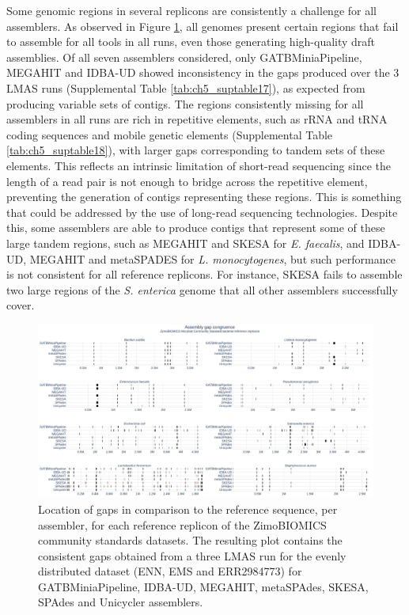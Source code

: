 Some genomic regions in several replicons are consistently a challenge for all assemblers. As observed in Figure \ref{fig:chap5_figure8}, all genomes present certain regions that fail to assemble for all tools in all runs, even those generating high-quality draft assemblies. Of all seven assemblers considered, only GATBMiniaPipeline, MEGAHIT and IDBA-UD showed inconsistency in the gaps produced over the 3 LMAS runs (Supplemental Table \ref{tab:ch5_suptable17}), as expected from producing variable sets of contigs. The regions consistently missing for all assemblers in all runs are rich in repetitive elements, such as rRNA and tRNA coding sequences and mobile genetic elements (Supplemental Table \ref{tab:ch5_suptable18}), with larger gaps corresponding to tandem sets of these elements. This reflects an intrinsic limitation of short-read sequencing since the length of a read pair is not enough to bridge across the repetitive element, preventing the generation of contigs representing these regions. This is something that could be addressed by the use of long-read sequencing technologies. Despite this, some assemblers are able to produce contigs that represent some of these large tandem regions, such as MEGAHIT and SKESA for \textit{E. faecalis}, and IDBA-UD, MEGAHIT and metaSPADES for \textit{L. monocytogenes}, but such performance is not consistent for all reference replicons. For instance, SKESA fails to assemble two large regions of the \textit{S. enterica} genome that all other assemblers successfully cover.

\begin{figure}[h!]
\centering
\includegraphics[width=\textwidth]{figures/chapter 5/Figure 8.png}
\caption{Location of gaps in comparison to the reference sequence, per assembler, for each reference replicon of the ZimoBIOMICS community standards datasets. The resulting plot contains the consistent gaps obtained from a three LMAS run for the evenly distributed dataset (ENN, EMS and ERR2984773) for GATBMiniaPipeline, IDBA-UD, MEGAHIT, metaSPAdes, SKESA, SPAdes and Unicycler assemblers.}
\label{fig:chap5_figure8}
\end{figure}

